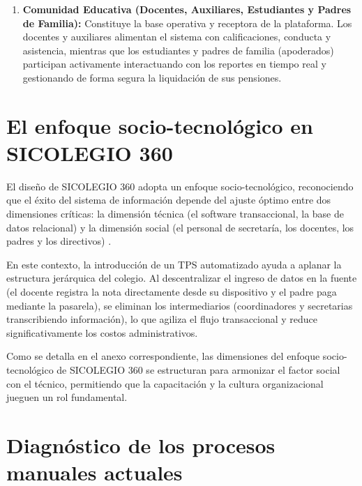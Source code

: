 \documentclass[12pt,a4paper,oneside]{report}
\begin{document}
\begin{enumerate}
\begin{itemize}
        \item Consolidar los datos transaccionales del TPS para alimentar el DSS y proveer reportes predictivos a la Dirección General (ausentismo crónico, cursos críticos y radar de calidad YoY).
        \item Brindar soporte técnico y capacitación continua a docentes, secretarios y apoderados.
    \end{itemize}
    \item \textbf{Comunidad Educativa (Docentes, Auxiliares, Estudiantes y Padres de Familia):} Constituye la base operativa y receptora de la plataforma. Los docentes y auxiliares alimentan el sistema con calificaciones, conducta y asistencia, mientras que los estudiantes y padres de familia (apoderados) participan activamente interactuando con los reportes en tiempo real y gestionando de forma segura la liquidación de sus pensiones.
\end{enumerate}

\section{El enfoque socio-tecnológico en SICOLEGIO 360}

El diseño de SICOLEGIO 360 adopta un enfoque socio-tecnológico, reconociendo que el éxito del sistema de información depende del ajuste óptimo entre dos dimensiones críticas: la dimensión técnica (el software transaccional, la base de datos relacional) y la dimensión social (el personal de secretaría, los docentes, los padres y los directivos) \citep{laudon2016}.

En este contexto, la introducción de un TPS automatizado ayuda a aplanar la estructura jerárquica del colegio. Al descentralizar el ingreso de datos en la fuente (el docente registra la nota directamente desde su dispositivo y el padre paga mediante la pasarela), se eliminan los intermediarios (coordinadores y secretarias transcribiendo información), lo que agiliza el flujo transaccional y reduce significativamente los costos administrativos.

Como se detalla en el anexo correspondiente, las dimensiones del enfoque socio-tecnológico de SICOLEGIO 360 se estructuran para armonizar el factor social con el técnico, permitiendo que la capacitación y la cultura organizacional jueguen un rol fundamental.

\section{Diagnóstico de los procesos manuales actuales}
\end{document}
